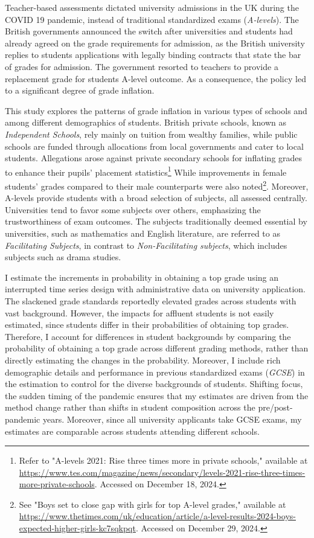 Teacher-based assessments dictated university admissions in the UK during the COVID 19 pandemic, instead of traditional standardized exams (\emph{A-levels}). The British governments announced the switch after universities and students had already agreed on the grade requirements for admission, as the British university replies to students applications with legally binding contracts that state the bar of grades for admission. The government resorted to teachers to provide a replacement grade for students A-level outcome. As a consequence, the policy led to a significant degree of grade inflation. 

This study explores the patterns of grade inflation in various types of schools and among different demographics of students. British private schools, known as \emph{Independent Schools}, rely mainly on tuition from wealthy families, while public schools are funded through allocations from local governments and cater to local students. Allegations arose against private secondary schools for inflating grades to enhance their pupils' placement statistics\footnote{Refer to "A-levels 2021: Rise three times more in private schools," available at \url{https://www.tes.com/magazine/news/secondary/levels-2021-rise-three-times-more-private-schools}. Accessed on December 18, 2024.} While improvements in female students' grades compared to their male counterparts were also noted\footnote{See "Boys set to close gap with girls for top A-level grades," available at \url{https://www.thetimes.com/uk/education/article/a-level-results-2024-boys-expected-higher-girls-kc7sqkpqt}. Accessed on December 29, 2024.}. Moreover, A-levels provide students with a broad selection of subjects, all assessed centrally. Universities tend to favor some subjects over others, emphasizing the trustworthiness of exam outcomes. The subjects traditionally deemed essential by universities, such as mathematics and English literature, are referred to as \emph{Facilitating Subjects}, in contrast to \emph{Non-Facilitating subjects}, which includes subjects such as drama studies.

I estimate the increments in probability in obtaining a top grade using an interrupted time series design with administrative data on university application. The slackened grade standards reportedly elevated grades across students with vast background. However, the impacts for affluent students is not easily estimated, since students differ in their probabilities of obtaining top grades. Therefore, I account for differences in student backgrounds by comparing the probability of obtaining a top grade across different grading methods, rather than directly estimating the changes in the probability. Moreover, I include rich demographic details and performance in previous standardized exams (\emph{GCSE}) in the estimation to control for the diverse backgrounds of students. Shifting focus, the sudden timing of the pandemic ensures that my estimates are driven from the method change rather than shifts in student composition across the pre/post-pandemic years. Moreover, since all university applicants take GCSE exams, my estimates are comparable across students attending different schools. 

